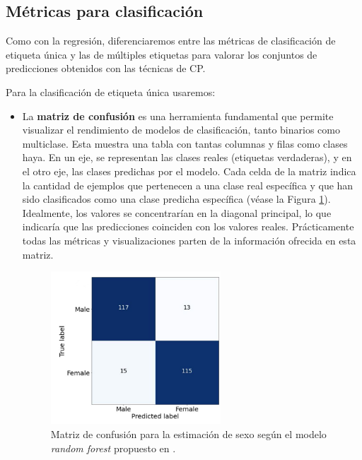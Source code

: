 
\subsection{Métricas para clasificación}

Como con la regresión, diferenciaremos entre las métricas de clasificación de etiqueta única y las de múltiples etiquetas para valorar los conjuntos de predicciones obtenidos con las técnicas de \acrshort{CP}.

Para la clasificación de etiqueta única usaremos: 

\begin{itemize}

    \item La \textbf{matriz de confusión} es una herramienta fundamental que permite visualizar el rendimiento de modelos de clasificación, tanto binarios como multiclase. Esta muestra una tabla con tantas columnas y filas como clases haya. En un eje, se representan las clases reales (etiquetas verdaderas), y en el otro eje, las clases predichas por el modelo. Cada celda de la matriz indica la cantidad de ejemplos que pertenecen a una clase real específica y que han sido clasificados como una clase predicha específica (véase la Figura \ref{fig:conf_matrix_binary}). Idealmente, los valores se concentrarían en la diagonal principal, lo que indicaría que las predicciones coinciden con los valores reales. Prácticamente todas las métricas y visualizaciones parten de la información ofrecida en esta matriz. 

    \begin{figure}[htbp]
        \centering
        \includegraphics[width=0.6\textwidth]{capitulos/cap_02/imagenes/confusion_matrix_binary.png}
        \caption{
            Matriz de confusión para la estimación de sexo según el modelo \textit{random forest} propuesto en \cite{bidmos2023}.
        } 
        \label{fig:conf_matrix_binary}
    \end{figure}


\end{itemize}
